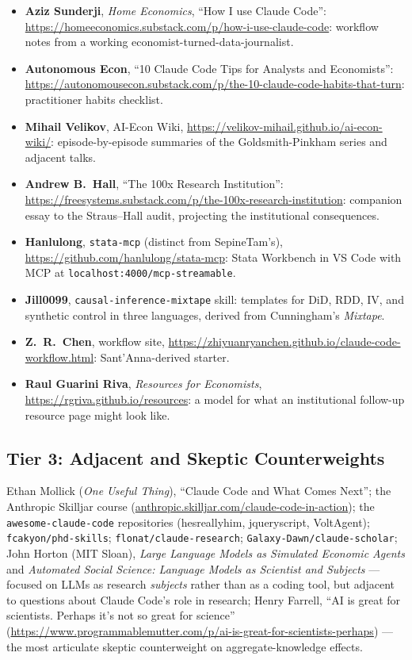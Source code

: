 \documentclass[11pt]{article}
\begin{document}
\begin{itemize}[leftmargin=*,nosep]
    \item \textbf{Aziz Sunderji}, \emph{Home Economics}, ``How I use Claude Code'': \url{https://homeeconomics.substack.com/p/how-i-use-claude-code}: workflow notes from a working economist-turned-data-journalist.
    \item \textbf{Autonomous Econ}, ``10 Claude Code Tips for Analysts and Economists'': \url{https://autonomousecon.substack.com/p/the-10-claude-code-habits-that-turn}: practitioner habits checklist.
    \item \textbf{Mihail Velikov}, AI-Econ Wiki, \url{https://velikov-mihail.github.io/ai-econ-wiki/}: episode-by-episode summaries of the Goldsmith-Pinkham series and adjacent talks.
    \item \textbf{Andrew B.\ Hall}, ``The 100x Research Institution'': \url{https://freesystems.substack.com/p/the-100x-research-institution}: companion essay to the Straus--Hall audit, projecting the institutional consequences.
    \item \textbf{Hanlulong}, \texttt{stata-mcp} (distinct from SepineTam's), \url{https://github.com/hanlulong/stata-mcp}: Stata Workbench in VS Code with MCP at \texttt{localhost:4000/mcp-streamable}.
    \item \textbf{Jill0099}, \texttt{causal-inference-mixtape} skill: templates for DiD, RDD, IV, and synthetic control in three languages, derived from Cunningham's \emph{Mixtape}.
    \item \textbf{Z.\ R.\ Chen}, workflow site, \url{https://zhiyuanryanchen.github.io/claude-code-workflow.html}: Sant'Anna-derived starter.
    \item \textbf{Raul Guarini Riva}, \emph{Resources for Economists}, \url{https://rgriva.github.io/resources}: a model for what an institutional follow-up resource page might look like.
\end{itemize}

\subsection{Tier 3: Adjacent and Skeptic Counterweights}

Ethan Mollick (\emph{One Useful Thing}), ``Claude Code and What Comes Next''; the Anthropic Skilljar course (\url{anthropic.skilljar.com/claude-code-in-action}); the \texttt{awesome-claude-code} repositories (hesreallyhim, jqueryscript, VoltAgent); \texttt{fcakyon/phd-skills}; \texttt{flonat/claude-research}; \texttt{Galaxy-Dawn/claude-scholar}; John Horton (MIT Sloan), \emph{Large Language Models as Simulated Economic Agents} and \emph{Automated Social Science: Language Models as Scientist and Subjects} --- focused on LLMs as research \emph{subjects} rather than as a coding tool, but adjacent to questions about Claude Code's role in research; Henry Farrell, ``AI is great for scientists. Perhaps it's not so great for science'' (\url{https://www.programmablemutter.com/p/ai-is-great-for-scientists-perhaps}) --- the most articulate skeptic counterweight on aggregate-knowledge effects.
\end{document}
